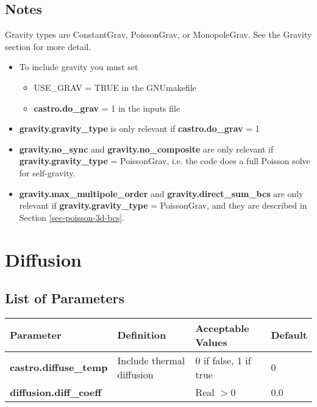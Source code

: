 \subsection{Notes}

Gravity types are ConstantGrav, PoissonGrav, or MonopoleGrav.  See the Gravity section for more detail.

\begin{itemize}
\item To include gravity you must set 
\begin{itemize}
\item USE\_GRAV  = TRUE in the GNUmakefile 
\item {\bf castro.do\_grav} = 1 in the inputs file
\end{itemize}
\item {\bf gravity.gravity\_type} is  only relevant if {\bf castro.do\_grav} = 1 
\item {\bf gravity.no\_sync} and {\bf gravity.no\_composite} are only relevant if {\bf gravity.gravity\_type} = PoissonGrav,
i.e. the code does a full Poisson solve for self-gravity.
\item {\bf gravity.max\_multipole\_order} and {\bf gravity.direct\_sum\_bcs} are only relevant if {\bf gravity.gravity\_type} = PoissonGrav,
and they are described in Section \ref{sec-poisson-3d-bcs}.
\end{itemize}

\section{Diffusion}

\subsection{List of Parameters}

\begin{table*}[h]
\begin{scriptsize}
\begin{center}
\begin{tabular}{|l|l|l|l|} \hline
Parameter & Definition & Acceptable Values &Default\\
\hline
{\bf castro.diffuse\_temp} & Include thermal diffusion & 0 if false, 1 if true & 0 \\
{\bf diffusion.diff\_coeff} & & Real $> 0$ & 0.0 \\
\hline
\end{tabular}
\label{Table:Diffusion}
\end{center}
\end{scriptsize}
\end{table*}

